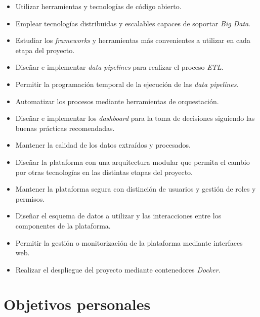 \begin{itemize}
    \item Utilizar herramientas y tecnologías de código abierto.

    \item Emplear tecnologías distribuidas y escalables capaces de soportar \textit{Big Data}.

    \item Estudiar los \textit{frameworks} y herramientas más convenientes a utilizar en cada etapa del proyecto.

    \item Diseñar e implementar \textit{data pipelines} para realizar el proceso \textit{ETL}.

    \item Permitir la programación temporal de la ejecución de las \textit{data pipelines}.

    \item Automatizar los procesos mediante herramientas de orquestación.

    \item Diseñar e implementar los \textit{dashboard} para la toma de decisiones siguiendo las buenas prácticas recomendadas.

    \item Mantener la calidad de los datos extraídos y procesados.

    \item Diseñar la plataforma con una arquitectura modular que permita el cambio por otras tecnologías en las distintas etapas del proyecto.

    \item Mantener la plataforma segura con distinción de usuarios y gestión de roles y permisos.

    \item Diseñar el esquema de datos a utilizar y las interacciones entre los componentes de la plataforma.

    \item Permitir la gestión o monitorización de la plataforma mediante interfaces web.

    \item Realizar el despliegue del proyecto mediante contenedores \textit{Docker}.
\end{itemize}

\section{Objetivos personales}

